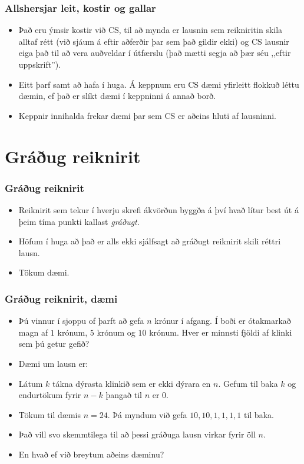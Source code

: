 \documentclass{beamer}
\begin{document}
\begin{frame}
	\frametitle{Allshersjar leit, kostir og gallar}
\begin{itemize}
	\item<1-> Það eru ýmsir kostir við CS, til að mynda er lausnin sem reikniritin skila alltaf rétt (við sjáum á eftir aðferðir þar sem það gildir ekki)
		og CS lausnir eiga það til að vera auðveldar í útfærslu (það mætti segja að þær séu ,,eftir uppskrift'').
	\item<2-> Eitt þarf samt að hafa í huga. Á keppnum eru CS dæmi yfirleitt flokkuð léttu dæmin, ef það er slíkt dæmi í keppninni á annað borð.
	\item<3-> Keppnir innihalda frekar dæmi þar sem CS er aðeins hluti af lausninni.
\end{itemize}
\end{frame}

\section{Gráðug reiknirit}

\begin{frame}
	\frametitle{Gráðug reiknirit}
\begin{itemize}
	\item<1-> Reiknirit sem tekur í hverju skrefi ákvörðun byggða á því hvað lítur best út á þeim tíma punkti kallast \emph{gráðugt}.
	\item<2-> Höfum í huga að það er alls ekki sjálfsagt að gráðugt reiknirit skili réttri lausn.
	\item<3-> Tökum dæmi.
\end{itemize}
\end{frame}

\begin{frame}
	\frametitle{Gráðug reiknirit, dæmi}
\begin{itemize}
	\item<1-> 
		Þú vinnur í sjoppu of þarft að gefa $n$ krónur í afgang. 
		Í boði er ótakmarkað magn af $1$ krónum, $5$ krónum og $10$ krónum.
		Hver er minnsti fjöldi af klinki sem þú getur gefið?
	\item<2-> Dæmi um lausn er:
	\item<3-> Látum $k$ tákna dýrasta klinkið sem er ekki dýrara en $n$. Gefum til baka $k$ og endurtökum fyrir $n - k$ þangað til $n$ er $0$.
	\item<4-> Tökum til dæmis $n = 24$. Þá myndum við gefa $10, 10, 1, 1, 1, 1$ til baka.
	\item<5-> Það vill svo skemmtilega til að þessi gráðuga lausn virkar fyrir öll $n$.
	\item<6-> En hvað ef við breytum aðeins dæminu?
\end{itemize}
\end{frame}
\end{document}
